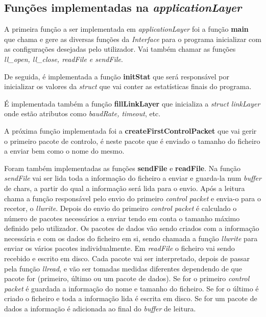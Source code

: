 \documentclass[11pt]{article}
\begin{document}
  \subsection{Funções implementadas na \textit{applicationLayer}}

A primeira função a ser implementada em \textit{applicationLayer} foi a função \textbf{main} que chama e gere as diversas funções da \textit{Interface} para o programa inicializar com as configurações desejadas pelo utilizador. Vai também chamar as funções \textit{ll\_open, ll\_close, readFile e sendFile}. 
\par De seguida, é implementada a função \textbf{initStat} que será responsável por inicializar os valores da \textit{struct} que vai conter as estatísticas finais do programa.
\par É implementada também a função \textbf{fillLinkLayer} que inicializa a \textit{struct linkLayer} onde estão atributos como \textit{baudRate, timeout}, etc.
\par A próxima função implementada foi a \textbf{createFirstControlPacket} que vai gerir o primeiro pacote de controlo, é neste pacote que é enviado o tamanho do ficheiro a enviar bem como o nome do mesmo.
\par Foram também implementadas as funções \textbf{sendFile} e \textbf{readFile}. Na função \textit{sendFile} vai ser lida toda a informação do ficheiro a enviar e guarda-la num \textit{buffer} de chars, a partir do qual a informação será lida para o envio. Após a leitura chama a função responsável pelo envio do primeiro \textit{control packet} e envia-o para o recetor, o \textit{llwrite}. Depois do envio do primeiro \textit{control packet} é calculado o número de pacotes necessários a enviar tendo em conta o tamanho máximo definido pelo utilizador. Os pacotes de dados vão sendo criados com a informação necessária e com os dados do ficheiro em si, sendo chamada a função \textit{llwrite} para enviar os vários pacotes individualmente. Em \textit{readFile} o ficheiro vai sendo recebido e escrito em disco. Cada pacote vai ser interpretado, depois de passar pela função \textit{llread}, e vão ser tomadas medidas diferentes dependendo de que pacote for (primeiro, último ou um pacote de dados). Se for o primeiro \textit{control packet} é guardada a informação do nome e tamanho do ficheiro. Se for o último é criado o ficheiro e toda a informação lida é escrita em disco. Se for um pacote de dados a informação é adicionada ao final do \textit{buffer} de leitura.


\end{document}

